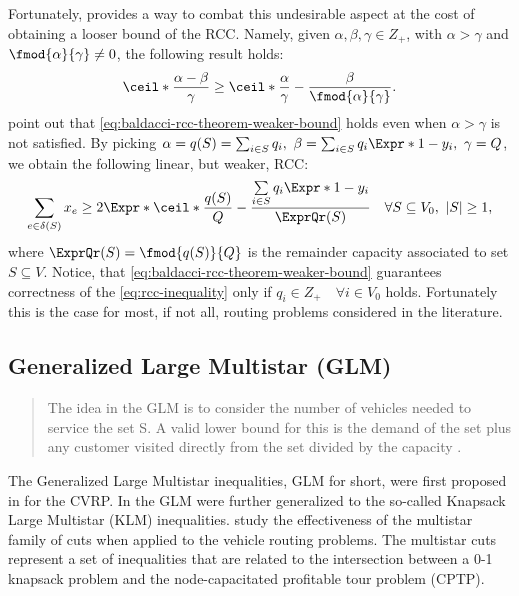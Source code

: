 Fortunately, \textcite{baldacci2007capacitated} provides a way to
combat this undesirable aspect at the cost of obtaining a looser bound of the RCC.
Namely, given $\alpha, \beta, \gamma \in Z_+$, with $\alpha > \gamma$ and
$\fmod{\alpha}{\gamma} \ne 0$, the following result holds:
\begin{equation}
	\label{eq:baldacci-rcc-theorem-weaker-bound}
	\ceil*{\frac{\alpha - \beta}{\gamma}} \ge \ceil*{\frac{\alpha}{\gamma}} - \frac{\beta}{\fmod{\alpha}{\gamma}}.
\end{equation}
\textcite{jepsen2014} point out that \cref{eq:baldacci-rcc-theorem-weaker-bound}
holds even when $\alpha > \gamma$ is not satisfied.
By picking $\alpha = q(S) = \sum_{i \in S} q_i,\ \beta = \sum_{i \in S} q_i\Expr*{1 - y_i},\ \gamma = Q$,
we obtain the following linear, but weaker, RCC:
\begin{equation}
	\label{eq:rcc-inequality}
	\sum\limits_{e \in \delta(S)} x_e \ge 2 \Expr*{\ceil*{\frac{q(S)}{Q}} - \frac{\sum\limits_{i \in S} q_i \Expr*{1 - y_i}}{\ExprQr(S)}} \quad \forall S \subseteq V_0,\ |S| \ge 1,
\end{equation}
where $\ExprQr(S) = \fmod{q(S)}{Q}$ is the remainder capacity associated to set $S \subseteq V$.
Notice, that \cref{eq:baldacci-rcc-theorem-weaker-bound} guarantees correctness
of the \cref{eq:rcc-inequality} only if $q_i \in Z_+ \quad \forall i \in V_0$ holds.
Fortunately this is the case for most, if not all, routing problems considered in the literature.

\subsection{Generalized Large Multistar (GLM)}
\label{sec:cptp-glm}

\begin{quote}
	The idea in the GLM is to consider the number of vehicles needed to service
	the set S. A valid lower bound for this is the demand of the set plus any
	customer visited directly from the set divided by the capacity \cite{jepsen2011}.
\end{quote}

The Generalized Large Multistar inequalities,
GLM for short,
were first proposed in \textcite{gouveia1995} for the CVRP.
In \textcite{letchford2002}
the GLM were further generalized to the so-called Knapsack Large Multistar (KLM) inequalities.
\textcite{letchford2006} study the effectiveness of the multistar family of cuts
when applied to the vehicle routing problems.
The multistar cuts represent a set of inequalities that are related to
the intersection between a 0-1 knapsack problem and the node-capacitated profitable tour problem (CPTP).

